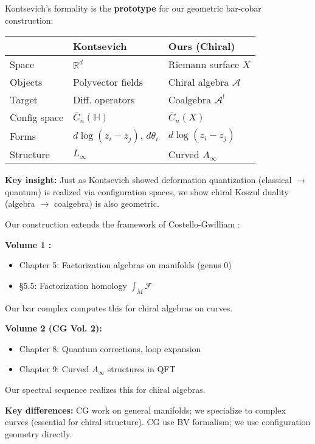 \begin{remark}\label{rem:kontsevich-chiral}
Kontsevich's formality is the \textbf{prototype} for our geometric bar-cobar construction:

\begin{center}
\small
\begin{tabular}{|l|l|l|}
\hline
& \textbf{Kontsevich} & \textbf{Ours (Chiral)} \\
\hline
Space & $\mathbb{R}^d$ & Riemann surface $X$ \\
Objects & Polyvector fields & Chiral algebra $\mathcal{A}$ \\
Target & Diff. operators & Coalgebra $\mathcal{A}^!$ \\
Config space & $\overline{C}_n(\mathbb{H})$ & $\overline{C}_n(X)$ \\
Forms & $d\log(z_i - z_j)$, $d\theta_i$ & $d\log(z_i - z_j)$ \\
Structure & $L_\infty$ & Curved $A_\infty$ \\
\hline
\end{tabular}
\end{center}

\textbf{Key insight:} Just as Kontsevich showed deformation quantization 
(classical $\to$ quantum) is realized via configuration spaces, we show chiral 
Koszul duality (algebra $\to$ coalgebra) is also geometric.
\end{remark}

\begin{remark}\label{rem:CG-factorization-detailed}
Our construction extends the framework of Costello-Gwilliam \cite{CG17}:

\textbf{Volume 1 \cite{CG17}:}
\begin{itemize}
\item Chapter 5: Factorization algebras on manifolds (genus 0)
\item §5.5: Factorization homology $\int_M \mathcal{F}$
\end{itemize}
Our bar complex computes this for chiral algebras on curves.

\textbf{Volume 2 (CG Vol. 2):}
\begin{itemize}
\item Chapter 8: Quantum corrections, loop expansion
\item Chapter 9: Curved $A_\infty$ structures in QFT
\end{itemize}
Our spectral sequence realizes this for chiral algebras.

\textbf{Key differences:} CG work on general manifolds; we specialize to complex curves 
(essential for chiral structure). CG use BV formalism; we use configuration geometry directly.
\end{remark}

